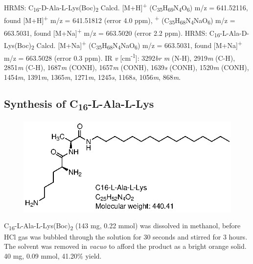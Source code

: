\newline
HRMS: C\textsubscript{16}-D-Ala-L-Lys(Boc)\textsubscript{2} Calcd. 
[M+H]\textsuperscript{+} (C\textsubscript{35}H\textsubscript{69}N\textsubscript{4}O\textsubscript{6}) m/z = 641.52116, found [M+H]\textsuperscript{+} m/z = 641.51812 (error 4.0 ppm),
\newline
[M+Na]\textsuperscript{+} (C\textsubscript{35}H\textsubscript{68}N\textsubscript{4}NaO\textsubscript{6}) m/z = 663.5031, found [M+Na]\textsuperscript{+} m/z = 663.5020 (error 2.2 ppm).
\newline
HRMS: C\textsubscript{16}-L-Ala-D-Lys(Boc)\textsubscript{2} Calcd. [M+Na]\textsuperscript{+} (C\textsubscript{35}H\textsubscript{68}N\textsubscript{4}NaO\textsubscript{6}) m/z = 663.5031, found [M+Na]\textsuperscript{+} m/z = 663.5028 (error 0.3 ppm).
\newline
IR \textit{v} [cm\textsuperscript{-1}]: 3292\textit{br m} (N-H), 2919\textit{m} (C-H), 2851\textit{m} (C-H), 1687\textit{m} (CONH), 1657\textit{m} (CONH), 1639\textit{s} (CONH), 1520\textit{m} (CONH), 1454\textit{m}, 1391\textit{m}, 1365\textit{m}, 1271\textit{m}, 1245\textit{s}, 1168\textit{s}, 1056\textit{m}, 868\textit{m}. 
\newline

\newpage
\subsection*{Synthesis of C\textsubscript{16}-L-Ala-L-Lys}
\begin{figure}[ht!]
\centering
\includegraphics{Figures/C16-L-Ala-L-Lys.eps}
\end{figure}
C\textsubscript{16}-L-Ala-L-Lys(Boc)\textsubscript{2} (143 mg, 0.22 mmol) was dissolved in methanol, before HCl gas was bubbled through the solution for 30 seconds and stirred for 3 hours. The solvent was removed in \textit{vacuo} to afford the product as a bright orange solid. 40 mg, 0.09 mmol, 41.20\% yield. 


